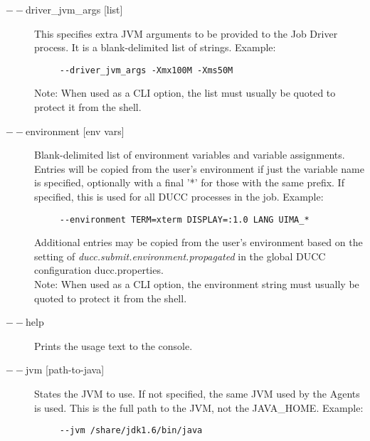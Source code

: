 \begin{description}
           \item[$--$driver\_jvm\_args {[list]} ]
             This specifies extra JVM arguments to be provided to the Job Driver process. It is a blank-delimited 
             list of strings. Example: 
             \begin{verbatim}
     --driver_jvm_args -Xmx100M -Xms50M
             \end{verbatim}
             Note: When used as a CLI option, the list must usually be
             quoted to protect it from the shell.

           \item[$--$environment {[env vars]}] Blank-delimited list of environment variables and
             variable assignments. 
             Entries will be copied from the user's environment if just the variable name is
             specified, optionally with a final '*' for those with the same prefix.
             If specified, this is used for all DUCC processes in the job. Example:
             \begin{verbatim}
     --environment TERM=xterm DISPLAY=:1.0 LANG UIMA_*
             \end{verbatim}
             Additional entries may be copied from the user's environment based on the setting of
             {\em ducc.submit.environment.propagated}
             in the global DUCC configuration ducc.properties.
             \\Note: When used as a CLI option, the environment string must usually be
             quoted to protect it from the shell.

           \item[$--$help ]
             Prints the usage text to the console. 

           \item[$--$jvm {[path-to-java]}  ]
             States the JVM to use. If not specified, the same JVM used by the Agents is used.  This is
             the full path to the JVM, not the JAVA\_HOME.
             Example: 
             \begin{verbatim}
     --jvm /share/jdk1.6/bin/java
             \end{verbatim}
             

\end{description}
